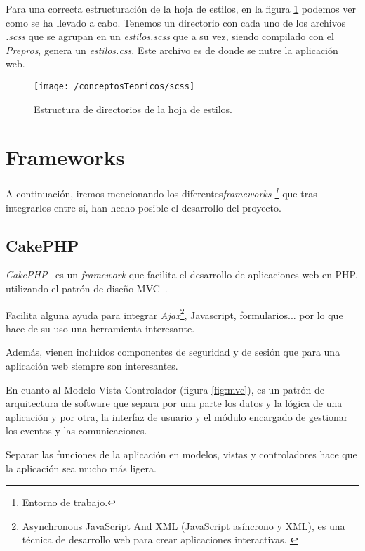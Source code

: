Para una correcta estructuración de la hoja de estilos, en la figura \ref{fig:scss} podemos ver como se ha llevado a cabo.
Tenemos un directorio con cada uno de los archivos \textit{.scss} que se agrupan en un \textit{estilos.scss} que a su vez, siendo compilado con el \textit{Prepros}, genera un \textit{estilos.css}. Este archivo es de donde se nutre la aplicación web.

\begin{figure}[ht]
	\centering
	\texttt{[image: /conceptosTeoricos/scss]}
	\caption{Estructura de directorios de la hoja de estilos.}
	\label{fig:scss}
\end{figure}

\newpage

\section{Frameworks }

A continuación, iremos mencionando los diferentes\textit{frameworks \footnote{Entorno de trabajo.}} que tras integrarlos entre sí, han hecho posible el desarrollo del proyecto.

\subsection{CakePHP}

\textit{CakePHP}~\cite{web:cakephp} es un \textit{framework} que facilita el desarrollo de aplicaciones web en PHP, utilizando el patrón de diseño MVC~\cite{wiki:cakephp}.

Facilita alguna ayuda para integrar \textit{Ajax}\footnote{Asynchronous JavaScript And XML (JavaScript asíncrono y XML), es una técnica de desarrollo web para crear aplicaciones interactivas. \cite{wiki:ajax}}, Javascript, formularios... por lo que hace de su uso una herramienta interesante.

Además, vienen incluidos componentes de seguridad y de sesión que para una aplicación web siempre son interesantes.

En cuanto al Modelo Vista Controlador (figura \ref{fig:mvc}), es un patrón de arquitectura de software que separa por una parte los datos y la lógica de una aplicación y por otra, la interfaz de usuario y el módulo encargado de gestionar los eventos y las comunicaciones. 

Separar las funciones de la aplicación en modelos, vistas y controladores hace que la aplicación sea mucho más ligera.

